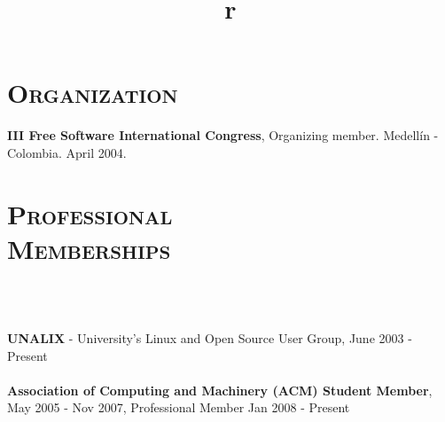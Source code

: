 \begin{resume}
\section{\textsc{Organization}}
\employer{\textbf{}}
\dates{}
\textbf{III Free Software International Congress}, Organizing member. Medell\'{i}n - Colombia. April 2004.

\section{\textsc{Professional\\ Memberships}}

\begin{formatb}
  \\
  \body\\
\end{formatb}
\employer{}
   {\textbf{UNALIX} - University's Linux and Open Source User Group,
     June 2003 - Present \\ \\
    \textbf{Association of Computing and Machinery (ACM) Student
      Member}, May 2005 - Nov 2007, Professional Member Jan 2008 - Present \\ \\
   }



\begin{formatb}
  \title{r}\\
  \\
 \body\\
\end{formatb}




\end{resume}
